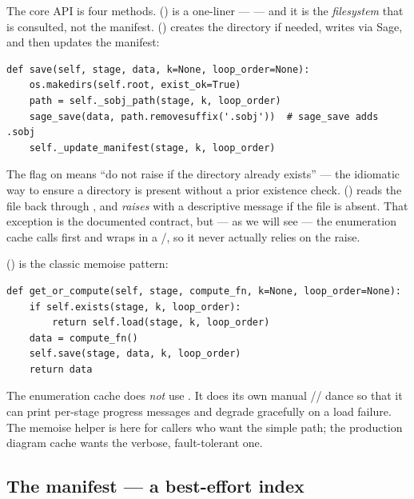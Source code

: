 The core API is four methods.  () is a one-liner
---  --- and it is the
\emph{filesystem} that is consulted, not the manifest. 
() creates the directory if needed, writes via Sage, and
then updates the manifest:

\begin{lstlisting}
def save(self, stage, data, k=None, loop_order=None):
    os.makedirs(self.root, exist_ok=True)
    path = self._sobj_path(stage, k, loop_order)
    sage_save(data, path.removesuffix('.sobj'))  # sage_save adds .sobj
    self._update_manifest(stage, k, loop_order)
\end{lstlisting}

The  flag on  means ``do not raise if
the directory already exists'' --- the idiomatic way to ensure a directory is
present without a prior existence check.  ()
reads the file back through , and \emph{raises}
 with a descriptive message if the file is absent. That
exception is the documented contract, but --- as we will see --- the
enumeration cache calls  first and wraps  in a
/, so it never actually relies on the raise.

 () is the classic memoise pattern:

\begin{lstlisting}
def get_or_compute(self, stage, compute_fn, k=None, loop_order=None):
    if self.exists(stage, k, loop_order):
        return self.load(stage, k, loop_order)
    data = compute_fn()
    self.save(stage, data, k, loop_order)
    return data
\end{lstlisting}

\begin{note}
The enumeration cache does \emph{not} use . It does its
own manual // dance so that it can print
per-stage progress messages and degrade gracefully on a load failure. The
memoise helper is here for callers who want the simple path; the production
diagram cache wants the verbose, fault-tolerant one.
\end{note}

\subsection{The manifest --- a best-effort index}

